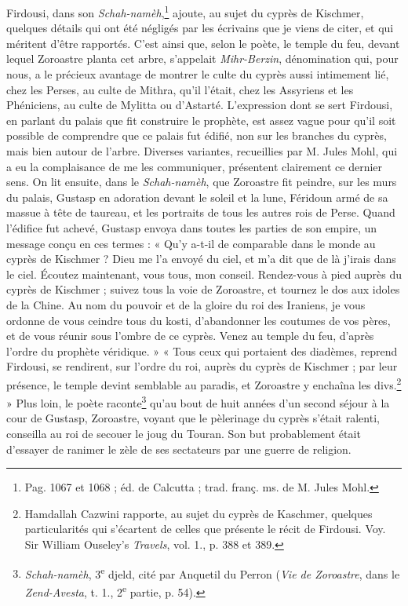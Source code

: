 \documentclass[a4paper, 11pt, oneside, polutonikogreek, french]{article}
\begin{document}
Firdousi, dans son \emph{Schah-namèh},\footnote{Pag. 1067 et 1068 ; éd. de Calcutta ; trad. franç. ms. de M. Jules Mohl.} ajoute, au sujet du cyprès de Kischmer, quelques détails qui ont été négligés par les écrivains que je viens de citer, et qui méritent d'être rapportés. C'est ainsi que, selon le poète, le temple du feu, devant lequel Zoroastre planta cet arbre, s'appelait \emph{Mihr-Berzin}, dénomination qui, pour nous, a le précieux avantage de montrer le culte du cyprès aussi intimement lié, chez les Perses, au culte de Mithra, qu'il l'était, chez les Assyriens et les Phéniciens, au culte de Mylitta ou d'Astarté. L'expression dont se sert Firdousi, en parlant du palais que fit construire le prophète, est assez vague pour qu'il soit possible de comprendre que ce palais fut édifié, non sur les branches du cyprès, mais bien autour de l'arbre. Diverses variantes, recueillies par M. Jules Mohl, qui a eu la complaisance de me les communiquer, présentent clairement ce dernier sens. On lit ensuite, dans le \emph{Schah-namèh}, que Zoroastre fit peindre, sur les murs du palais, Gustasp en adoration devant le soleil et la lune, Féridoun armé de sa massue à tête de taureau, et les portraits de tous les autres rois de Perse. Quand l'édifice fut achevé, Gustasp envoya dans toutes les parties de son empire, un message conçu en ces termes : « Qu'y a-t-il de comparable dans le monde au cyprès de Kischmer ? Dieu me l'a envoyé du ciel, et m'a dit que de là j'irais dans le ciel. Écoutez maintenant, vous tous, mon conseil. Rendez-vous à pied auprès du cyprès de Kischmer ; suivez tous la voie de Zoroastre, et tournez le dos aux idoles de la Chine. Au nom du pouvoir et de la gloire du roi des Iraniens, je vous ordonne de vous ceindre tous du kosti, d'abandonner les coutumes de vos pères, et de vous réunir sous l'ombre de ce cyprès. Venez au temple du feu, d'après l'ordre du prophète véridique. » « Tous ceux qui portaient des diadèmes, reprend Firdousi, se rendirent, sur l'ordre du roi, auprès du cyprès de Kischmer ; par leur présence, le temple devint semblable au paradis, et Zoroastre y enchaîna les divs.\footnote{Hamdallah Cazwini rapporte, au sujet du cyprès de Kaschmer, quelques particularités qui s'écartent de celles que présente le récit de Firdousi. Voy. Sir William Ouseley's \emph{Travels}, vol. 1., p. 388 et 389.} » Plus loin, le poète raconte\footnote{\emph{Schah-namèh}, 3\textsuperscript{e} djeld, cité par Anquetil du Perron (\emph{Vie de Zoroastre}, dans le \emph{Zend-Avesta}, t. 1., 2\textsuperscript{e} partie, p. 54).} qu'au bout de huit années d'un second séjour à la cour de Gustasp, Zoroastre, voyant que le pèlerinage du cyprès s'était ralenti, conseilla au roi de secouer le joug du Touran. Son but probablement était d'essayer de ranimer le zèle de ses sectateurs par une guerre de religion.
\end{document}
